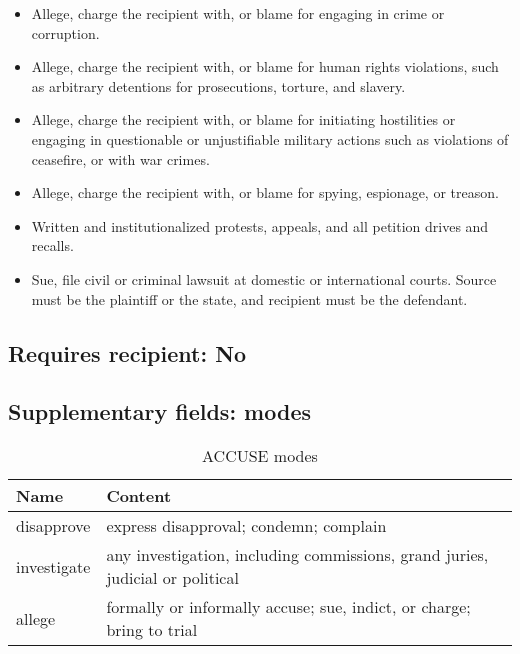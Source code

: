 \documentclass[11pt]{report}
\newcommand{\plcat}[1]{\textsf{#1}}
\begin{document}
\begin{itemize}
\item  Allege, charge the recipient with, or blame for engaging in crime or corruption.
\item Allege, charge the recipient with, or blame for human rights violations, such as arbitrary detentions for prosecutions, torture, and slavery.
\item Allege, charge the recipient with, or blame for initiating hostilities or engaging in questionable or unjustifiable military actions such as violations of ceasefire, or with war crimes.
\item Allege, charge the recipient with, or blame for spying, espionage, or treason.
\item Written and institutionalized protests, appeals, and all petition drives and recalls. %
\item Sue, file civil or criminal lawsuit at domestic or international courts. Source must be the plaintiff or the state, and recipient must be the defendant.

\end{itemize}

\subsection{Requires recipient: No}

\subsection{Supplementary fields: modes}

\begin{table}[htp]
\caption{\plcat{ACCUSE} modes}
\begin{center}
\begin{tabular}{|l|p{13cm}|}
\hline
Name & Content \\
\hline
disapprove & express disapproval; condemn; complain\\
investigate & any investigation, including commissions, grand juries, judicial or political\\
allege & formally or informally accuse; sue, indict, or charge; bring to trial\\
\hline
\end{tabular}
\end{center}
\label{tab:accusemode}
\end{table}%


\newpage  
\end{document}
